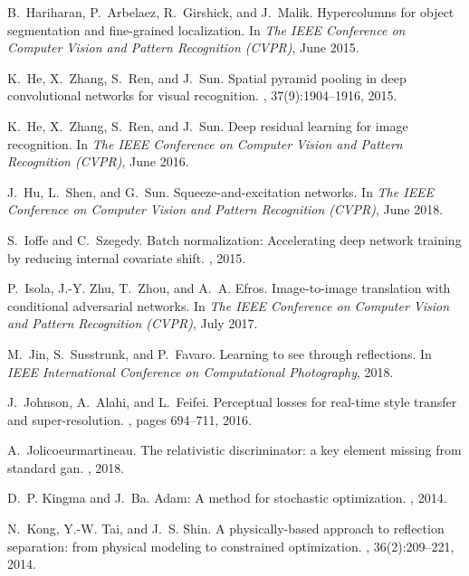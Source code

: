\documentclass[10pt,twocolumn,letterpaper]{article}
\begin{document}
{\begin{thebibliography}{10}
B.~Hariharan, P.~Arbelaez, R.~Girshick, and J.~Malik.
\newblock Hypercolumns for object segmentation and fine-grained localization.
\newblock In {\em The IEEE Conference on Computer Vision and Pattern
  Recognition (CVPR)}, June 2015.

K.~He, X.~Zhang, S.~Ren, and J.~Sun.
\newblock Spatial pyramid pooling in deep convolutional networks for visual
  recognition.
, 37(9):1904--1916, 2015.

K.~He, X.~Zhang, S.~Ren, and J.~Sun.
\newblock Deep residual learning for image recognition.
\newblock In {\em The IEEE Conference on Computer Vision and Pattern
  Recognition (CVPR)}, June 2016.

J.~Hu, L.~Shen, and G.~Sun.
\newblock Squeeze-and-excitation networks.
\newblock In {\em The IEEE Conference on Computer Vision and Pattern
  Recognition (CVPR)}, June 2018.

S.~Ioffe and C.~Szegedy.
\newblock Batch normalization: Accelerating deep network training by reducing
  internal covariate shift.
, 2015.

P.~Isola, J.-Y. Zhu, T.~Zhou, and A.~A. Efros.
\newblock Image-to-image translation with conditional adversarial networks.
\newblock In {\em The IEEE Conference on Computer Vision and Pattern
  Recognition (CVPR)}, July 2017.

M.~Jin, S.~Susstrunk, and P.~Favaro.
\newblock Learning to see through reflections.
\newblock In {\em IEEE International Conference on Computational Photography},
  2018.

J.~Johnson, A.~Alahi, and L.~Feifei.
\newblock Perceptual losses for real-time style transfer and super-resolution.
, pages 694--711,
  2016.

A.~Jolicoeurmartineau.
\newblock The relativistic discriminator: a key element missing from standard
  gan.
, 2018.

D.~P. Kingma and J.~Ba.
\newblock Adam: A method for stochastic optimization.
, 2014.

N.~Kong, Y.-W. Tai, and J.~S. Shin.
\newblock A physically-based approach to reflection separation: from physical
  modeling to constrained optimization.
, 36(2):209--221, 2014.


\end{thebibliography}}
\end{document}
